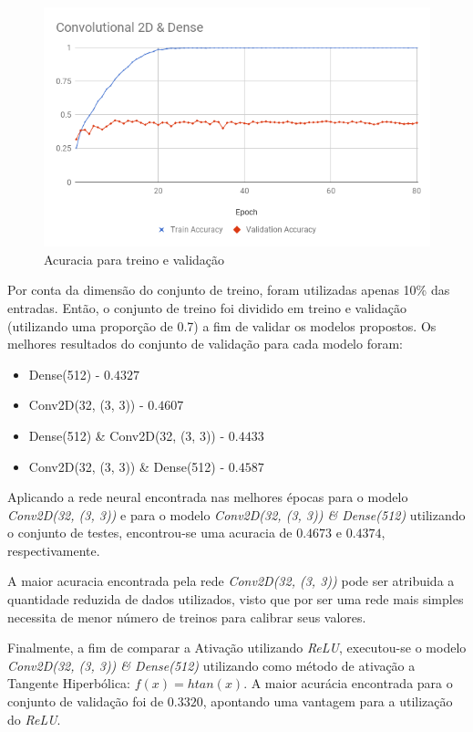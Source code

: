 \documentclass[conference]{IEEEtran}
\begin{document}
\begin{figure}[h!]
	\includegraphics[scale=0.4]{conv_dense.png}
	\caption{Acuracia para treino e validação}
	\label{fig:conv_dense}
\end{figure}

Por conta da dimensão do conjunto de treino, foram utilizadas apenas 10\% das entradas. Então, o conjunto de treino foi dividido em treino e validação (utilizando uma proporção de 0.7) a fim de validar os modelos propostos. Os melhores resultados do conjunto de validação para cada modelo foram: 

\begin{itemize}
	\item Dense(512) - $0.4327$
	\item Conv2D(32, (3, 3)) - $0.4607$
	\item Dense(512) \& Conv2D(32, (3, 3)) - $0.4433$
	\item Conv2D(32, (3, 3)) \& Dense(512) - $0.4587$
\end{itemize}

Aplicando a rede neural encontrada nas melhores épocas para o modelo \textit{Conv2D(32, (3, 3))} e para o modelo \textit{Conv2D(32, (3, 3)) \& Dense(512)} utilizando o conjunto de testes, encontrou-se uma acuracia de $0.4673$ e $0.4374$, respectivamente. 

A maior acuracia encontrada pela rede \textit{Conv2D(32, (3, 3))} pode ser atribuida a quantidade reduzida de dados utilizados, visto que por ser uma rede mais simples necessita de menor número de treinos para calibrar seus valores. 

Finalmente, a fim de comparar a Ativação utilizando \textit{ReLU}, executou-se o modelo \textit{Conv2D(32, (3, 3)) \& Dense(512)} utilizando como método de ativação a Tangente Hiperbólica: $f(x) = htan(x)$. A maior acurácia encontrada para o conjunto de validação foi de $0.3320$, apontando uma vantagem para a utilização do \textit{ReLU}. 
\end{document}
